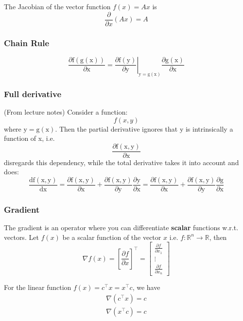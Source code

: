 The Jacobian of the vector function $f(x) = Ax$ is
$$
\frac{\partial}{\partial x}(Ax)=A
$$

\subsubsection{Chain Rule}
$$
\frac{\partial \mathrm{f}(\mathrm{g}(\mathrm{x}))}{\partial \mathrm{x}}=\left.\frac{\partial \mathrm{f}(\mathrm{y})}{\partial \mathrm{y}}\right|_{\mathrm{y}=\mathrm{g}(\mathrm{x})} \frac{\partial \mathrm{g}(\mathrm{x})}{\partial \mathrm{x}}
$$
\subsubsection{Full derivative}
(From lecture notes)
Consider a function:
$$
f(x, y)
$$
where $\mathrm{y}=\mathrm{g}(\mathrm{x})$. Then the partial derivative ignores that $\mathrm{y}$ is intrinsically a function of x, i.e.
$$
\frac{\partial \mathrm{f}(\mathrm{x}, \mathrm{y})}{\partial \mathrm{x}}
$$
disregards this dependency, while the total derivative takes it into account and does:
$$
\frac{\mathrm{df}(\mathrm{x}, \mathrm{y})}{\mathrm{dx}}=\frac{\partial \mathrm{f}(\mathrm{x}, \mathrm{y})}{\partial \mathrm{x}}+\frac{\partial \mathrm{f}(\mathrm{x}, \mathrm{y})}{\partial \mathrm{y}} \frac{\partial \mathrm{y}}{\partial \mathrm{x}}=\frac{\partial \mathrm{f}(\mathrm{x}, \mathrm{y})}{\partial \mathrm{x}}+\frac{\partial \mathrm{f}(\mathrm{x}, \mathrm{y})}{\partial \mathrm{y}} \frac{\partial \mathrm{g}}{\partial \mathrm{x}}
$$

\subsubsection{Gradient}
The gradient is an operator where you can differentiate \textbf{scalar} functions w.r.t. vectors. Let $f(x)$ be a scalar function of the vector $x$ i.e. $f:\mathbb R^n\rightarrow\mathbb R$, then
$$
\nabla f(x)=\left[\frac{\partial f}{\partial x}\right]^\top=
\begin{bmatrix}
    \frac{\partial f}{\partial x_1}\\
    \vdots\\
    \frac{\partial f}{\partial x_n}
\end{bmatrix}
$$

For the linear function $f(x)=c^\top x=x^\top c$, we have
\begin{equation*}
    \begin{split}
        \nabla(c^\top x)=c\\
        \nabla(x^\top c)=c\\
    \end{split}
\end{equation*}

